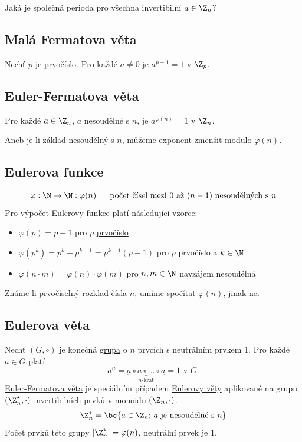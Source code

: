 Jaká je společná perioda pro všechna invertibilní $a \in \Z_n$?

\subsection{Malá Fermatova věta}\label{malaFermat}
Nechť $p$ je \hyperref[prvocisla]{prvočíslo}. Pro každé $a \not= 0$ je $a^{p-1} = 1$ v $\Z_p$.

\subsection{Euler-Fermatova věta}\label{eulerFermat}
Pro každé $a \in \Z_n$, $a$ nesoudělné s $n$, je $a^{\varphi(n)} = 1$ v $\Z_n$.

Aneb je-li základ nesoudělný s $n$, můžeme exponent zmenšit modulo $\varphi(n)$.

\subsection{Eulerova funkce}\label{eulerFun}
\begin{equation}
	\varphi : \N \rightarrow \N: \varphi(n) = \text{ počet čísel mezi 0 až } (n-1) \text{ nesoudělných s }n
\end{equation}
Pro výpočet Eulerovy funkce platí následující vzorce:
\vspace{-1em}
\begin{itemize}
	\item $\varphi(p) = p-1$ pro $p$ \hyperref[prvocisla]{prvočíslo}
	\item $\varphi(p^k) = p^k - p^{k-1} = p^{k-1}(p-1)$ pro $p$ prvočíslo a $k \in \N$
	\item $\varphi(n \cdot m) = \varphi(n) \cdot \varphi(m)$ pro $n,m \in \N$ navzájem nesoudělná
\end{itemize}
\vspace{-1em}
Známe-li prvočíselný rozklad čísla $n$, umíme spočítat $\varphi(n)$, jinak ne.

\subsection{Eulerova věta}\label{euler}
Nechť $(G, \circ)$ je konečná \hyperref[grupa]{grupa} o $n$ prvcích s neutrálním prvkem 1. Pro každé $a \in G$ platí
\begin{equation}
	a^n = \underbrace{a \circ a \circ \dots \circ a}_{n\text{-krát}} = 1 \text{ v } G.
\end{equation}
\hyperref[eulerFermat]{Euler-Fermatova věta} je speciálním případem \hyperref[euler]{Eulerovy věty} aplikované na grupu $(\Z_n^\star, \cdot)$ invertibilních prvků v monoidu $(\Z_n, \cdot)$.
\begin{equation}
	\Z_n^\star = \bc{a \in \Z_n; \, a \text{ je nesoudělné s } n}
\end{equation}
Počet prvků této grupy $|\Z_n^\star| = \varphi(n)$, neutrální prvek je 1.

